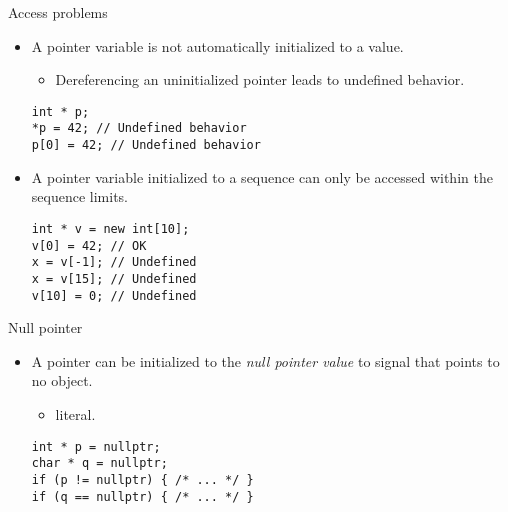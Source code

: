 \begin{frame}[fragile]{Access problems}
\begin{itemize}
  \item A pointer variable is not automatically initialized to a value.
    \begin{itemize}
      \item Dereferencing an uninitialized pointer leads to undefined behavior.
    \end{itemize}
\begin{lstlisting}
int * p;
*p = 42; // Undefined behavior
p[0] = 42; // Undefined behavior
\end{lstlisting}

  \item A pointer variable initialized to a sequence can only be accessed within
        the sequence limits.
\begin{lstlisting}
int * v = new int[10];
v[0] = 42; // OK
x = v[-1]; // Undefined
x = v[15]; // Undefined
v[10] = 0; // Undefined
\end{lstlisting}
\end{itemize}
\end{frame}

\begin{frame}[t,fragile]{Null pointer}
\begin{itemize}
  \item A pointer can be initialized to the \emph{null pointer value} to signal
        that points to no object.
    \begin{itemize}
      \item {} literal.
    \end{itemize}
\begin{lstlisting}
int * p = nullptr;
char * q = nullptr;
if (p != nullptr) { /* ... */ }
if (q == nullptr) { /* ... */ }
\end{lstlisting}
\end{itemize}
\end{frame}

